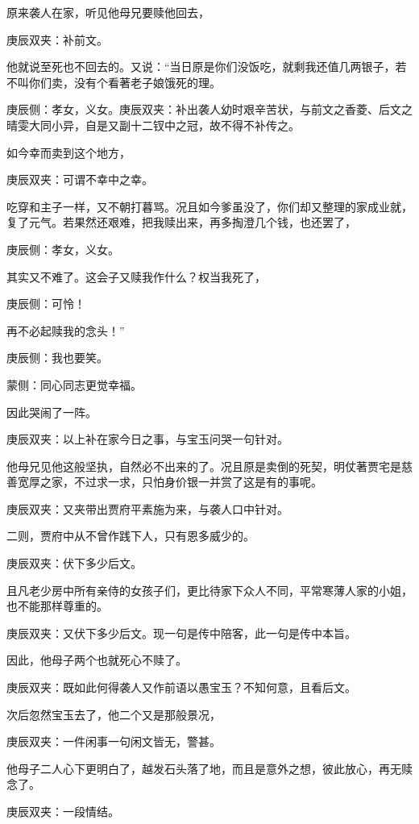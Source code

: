 \begin{parag}
    原来袭人在家，听见他母兄要赎他回去，\begin{note}庚辰双夹：补前文。\end{note}他就说至死也不回去的。又说：“当日原是你们没饭吃，就剩我还值几两银子，若不叫你们卖，没有个看著老子娘饿死的理。\begin{note}庚辰侧：孝女，义女。庚辰双夹：补出袭人幼时艰辛苦状，与前文之香菱、后文之晴雯大同小异，自是又副十二钗中之冠，故不得不补传之。\end{note}如今幸而卖到这个地方，\begin{note}庚辰双夹：可谓不幸中之幸。\end{note}吃穿和主子一样，又不朝打暮骂。况且如今爹虽没了，你们却又整理的家成业就，复了元气。若果然还艰难，把我赎出来，再多掏澄几个钱，也还罢了，\begin{note}庚辰侧：孝女，义女。\end{note}其实又不难了。这会子又赎我作什么？权当我死了，\begin{note}庚辰侧：可怜！\end{note}再不必起赎我的念头！”\begin{note}庚辰侧：我也要笑。\end{note}\begin{note}蒙侧：同心同志更觉幸福。\end{note}因此哭闹了一阵。\begin{note}庚辰双夹：以上补在家今日之事，与宝玉问哭一句针对。\end{note}
\end{parag}


\begin{parag}
    他母兄见他这般坚执，自然必不出来的了。况且原是卖倒的死契，明仗著贾宅是慈善宽厚之家，不过求一求，只怕身价银一并赏了这是有的事呢。\begin{note}庚辰双夹：又夹带出贾府平素施为来，与袭人口中针对。\end{note}二则，贾府中从不曾作践下人，只有恩多威少的。\begin{note}庚辰双夹：伏下多少后文。\end{note}且凡老少房中所有亲侍的女孩子们，更比待家下众人不同，平常寒薄人家的小姐，也不能那样尊重的。\begin{note}庚辰双夹：又伏下多少后文。现一句是传中陪客，此一句是传中本旨。\end{note}因此，他母子两个也就死心不赎了。\begin{note}庚辰双夹：既如此何得袭人又作前语以愚宝玉？不知何意，且看后文。\end{note}次后忽然宝玉去了，他二个又是那般景况，\begin{note}庚辰双夹：一件闲事一句闲文皆无，警甚。\end{note}他母子二人心下更明白了，越发石头落了地，而且是意外之想，彼此放心，再无赎念了。\begin{note}庚辰双夹：一段情结。\end{note}
\end{parag}


